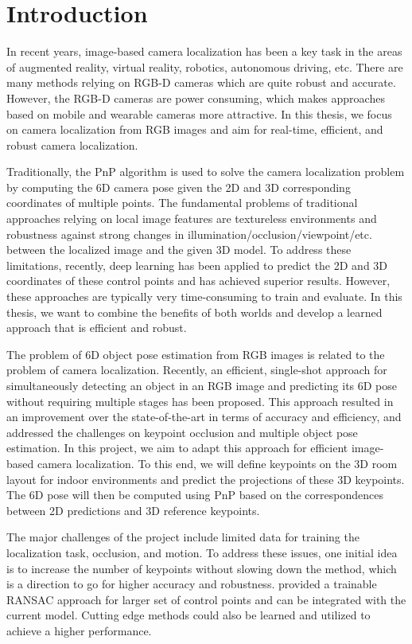 \chapter{Introduction}

In recent years, image-based camera localization has been a key task in the areas of augmented reality, virtual reality, robotics, autonomous driving, etc. There are many methods relying on RGB-D cameras which are quite robust and accurate. However, the RGB-D cameras are power consuming, which makes approaches based on mobile and wearable cameras more attractive. In this thesis, we focus on camera localization from RGB images and aim for real-time, efficient, and robust camera localization.

Traditionally, the PnP algorithm \cite{lepetit2009epnp} is used to solve the camera localization problem by computing the 6D camera pose given the 2D and 3D corresponding coordinates of multiple points. The fundamental problems of traditional approaches relying on local image features are textureless environments and robustness against strong changes in illumination/occlusion/viewpoint/etc. between the localized image and the given 3D model. To address these limitations, recently, deep learning has been applied to predict the 2D and 3D coordinates of these control points \cite{brachmann2017dsac} and has achieved superior results. However, these approaches are typically very time-consuming to train and evaluate. In this thesis, we want to combine the benefits of both worlds and develop a learned approach that is efficient and robust.

The problem of 6D object pose estimation from RGB images is related to the problem of camera localization. Recently, an efficient, single-shot approach for simultaneously detecting an object in an RGB image and predicting its 6D pose without requiring multiple stages \cite{tekin2018real} has been proposed. This approach resulted in an improvement over the state-of-the-art in terms of accuracy and efficiency, and addressed the challenges on keypoint occlusion and multiple object pose estimation. In this project, we aim to adapt this approach for efficient image-based camera localization. To this end, we will define keypoints on the 3D room layout for indoor environments and predict the projections of these 3D keypoints. The 6D pose will then be computed using PnP \cite{lepetit2009epnp} based on the correspondences between 2D predictions and 3D reference keypoints.

The major challenges of the project include limited data for training the localization task, occlusion, and motion. To address these issues, one initial idea is to increase the number of keypoints without slowing down the method, which is a direction to go for higher accuracy and robustness. \cite{brachmann2017dsac} provided a trainable RANSAC approach for larger set of control points and can be integrated with the current model. Cutting edge methods could also be learned and utilized to achieve a higher performance.


